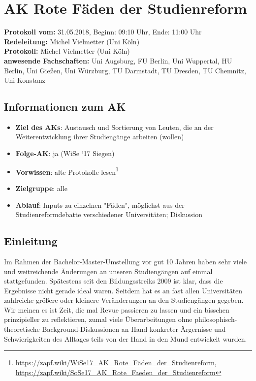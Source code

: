 
\section{AK Rote Fäden der Studienreform}

	\textbf{Protokoll vom:} 31.05.2018,
	Beginn: 09:10 Uhr,
	Ende: 11:00 Uhr \\
	\textbf{Redeleitung:} Michel Vielmetter (Uni Köln) \\
	\textbf{Protokoll:} Michel Vielmetter (Uni Köln) \\
	\textbf{anwesende Fachschaften:} Uni Augsburg, FU Berlin, Uni Wuppertal, HU Berlin, Uni Gießen, Uni Würzburg, TU Darmstadt, TU Dresden, TU Chemnitz, Uni Konstanz

	\subsection*{Informationen zum AK}
		\begin{itemize}
			\item \textbf{Ziel des AKs}: Austausch und Sortierung von Leuten, die an der Weiterentwicklung ihrer Studiengänge arbeiten (wollen)
			\item \textbf{Folge-AK}: ja (WiSe `17 Siegen)
			\item \textbf{Vorwissen}: alte Protokolle lesen\footnote{\url{https://zapf.wiki/WiSe17_AK_Rote_Fäden_der_Studienreform}, \url{https://zapf.wiki/SoSe17_AK_Rote_Faeden_der_Studienreform}}
			\item \textbf{Zielgruppe}: alle
			\item \textbf{Ablauf}: Inputs zu einzelnen "Fäden", möglichst aus der Studienreformdebatte verschiedener Universitäten; Diskussion
		\end{itemize}

  \subsection*{Einleitung}
    Im Rahmen der Bachelor-Master-Umstellung vor gut 10 Jahren haben sehr viele und weitreichende Änderungen an unseren Studiengängen auf einmal stattgefunden. Spätestens seit den Bildungsstreiks 2009 ist klar, dass die Ergebnisse nicht gerade ideal waren. Seitdem hat es an fast allen Universitäten zahlreiche größere oder kleinere Veränderungen an den Studiengängen gegeben. Wir meinen es ist Zeit, die mal Revue passieren zu lassen und ein bisschen prinzipieller zu reflektieren, zumal viele Überarbeitungen ohne philosophisch-theoretische Background-Diskussionen an Hand konkreter Ärgernisse und Schwierigkeiten des Alltages teils von der Hand in den Mund entwickelt wurden. \\ %

